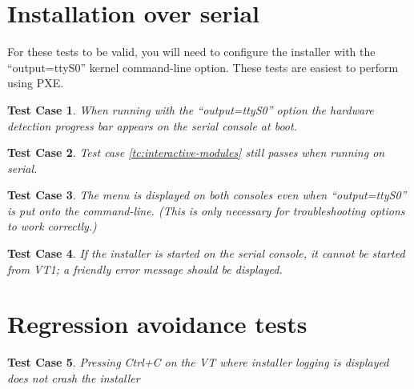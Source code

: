 \documentclass[a4paper]{article}
\newtheorem{testcase}{Test Case}
\begin{document}
\section{Installation over serial}

For these tests to be valid, you will need to configure the installer
with the ``output=ttyS0'' kernel command-line option.  These tests are
easiest to perform using PXE.

\begin{testcase}
When running with the ``output=ttyS0'' option the hardware detection
progress bar appears on the serial console at boot.
\end{testcase}

\begin{testcase}
Test case \ref{tc:interactive-modules} still passes when running on serial.
\end{testcase}

\begin{testcase}
The menu is displayed on both consoles even when ``output=ttyS0'' is
put onto the command-line.  (This is only necessary for
troubleshooting options to work correctly.)
\end{testcase}

\begin{testcase}
If the installer is started on the serial console, it cannot be
started from VT1; a friendly error message should be displayed.
\end{testcase}

\section{Regression avoidance tests}

\begin{testcase}
Pressing Ctrl+C on the VT where installer logging is displayed does
not crash the installer
\end{testcase}
\end{document}
